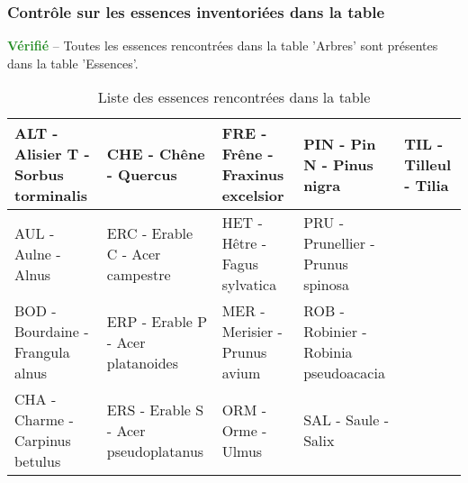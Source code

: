 \documentclass[a4paper]{article}
\begin{document}
\subsubsection{Contrôle sur les essences inventoriées dans la table}\textcolor{ForestGreen}{\textbf{Vérifié}} -- Toutes les essences rencontrées dans la table 'Arbres' sont présentes dans la table 'Essences'.%
\begin{table}[ht]
\centering
\begingroup\scriptsize
\begin{tabular}{|M{1.5cm}|M{1.5cm}|M{1.5cm}|M{1.5cm}|M{1.5cm}|}
   \hline
ALT - Alisier T - Sorbus torminalis & CHE - Chêne - Quercus & FRE - Frêne - Fraxinus excelsior & PIN - Pin N - Pinus nigra & TIL - Tilleul - Tilia \\ 
   \hline
AUL - Aulne - Alnus & ERC - Erable C - Acer campestre & HET - Hêtre - Fagus sylvatica & PRU - Prunellier - Prunus spinosa &  \\ 
   \hline
BOD - Bourdaine - Frangula alnus & ERP - Erable P - Acer platanoides & MER - Merisier - Prunus avium & ROB - Robinier - Robinia pseudoacacia &  \\ 
   \hline
CHA - Charme - Carpinus betulus & ERS - Erable S - Acer pseudoplatanus & ORM - Orme - Ulmus & SAL - Saule - Salix &  \\ 
   \hline
\end{tabular}
\endgroup
\caption{\footnotesize{Liste des essences rencontrées dans la table}} 
\label{TabEssences}
\end{table}
\end{document}
